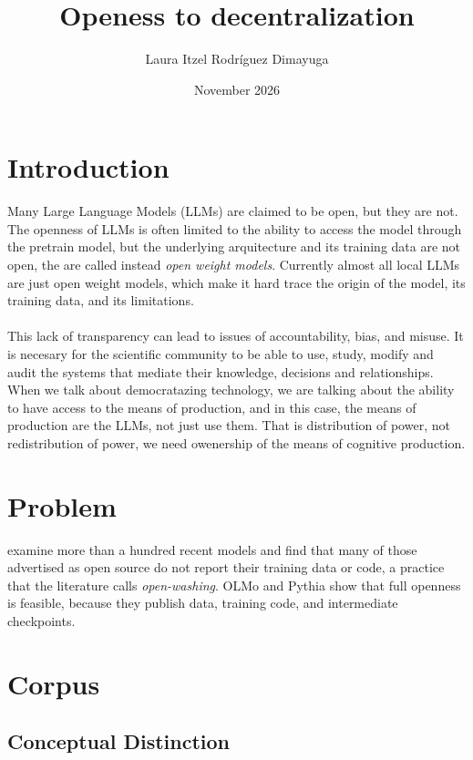 \documentclass{article}
\title{Openess to decentralization }
\author{Laura Itzel Rodríguez Dimayuga}
\date{November 2026}
\begin{document}
\maketitle

\section{Introduction}
Many Large Language Models (LLMs) are claimed to be open, but they are not. The openness of LLMs is often limited to the ability to access the model through the pretrain model, but the underlying arquitecture and its training data are not open, the are called instead \textit{open weight models}. Currently almost all local LLMs are just open weight models, which make it hard trace the origin of the model, its training data, and its limitations. 
\\ \\
This lack of transparency can lead to issues of accountability, bias, and misuse. It is necesary for the scientific community to be able to use, study, modify and audit the systems that mediate their knowledge, decisions and relationships. When we talk about democratazing technology, we are talking about the ability to have access to the means of production, and in this case, the means of production are the LLMs, not just use them. That is distribution of power, not redistribution of power, we need owenership of the means of cognitive production. 

\section{Problem}

\textcite{sapkota2025comprehensive} examine more than a hundred recent models and find that many of those advertised as open source do not report their training data or code, a practice that the literature calls \textit{open-washing}. OLMo \cite{groeneveld-etal-2024-olmo} and Pythia \cite{biderman2023pythia} show that full openness is feasible, because they publish data, training code, and intermediate checkpoints.



\section{Corpus}

\subsection{Conceptual Distinction}
\end{document}
